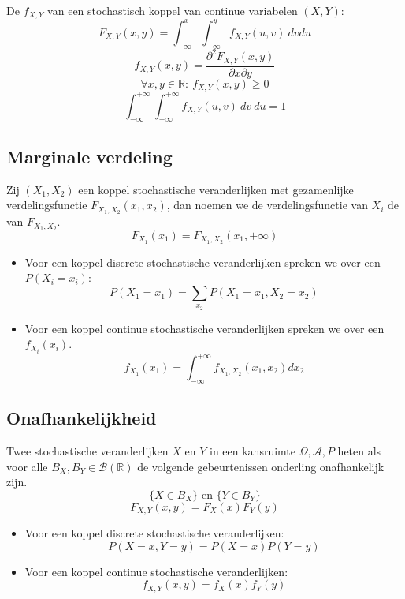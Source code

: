 \documentclass[main.tex]{subfiles}
\begin{document}
\begin{de}
  De  $f_{X,Y}$ van een stochastisch koppel van continue variabelen $(X,Y)$:
  \[ F_{X,Y}(x,y) = \int_{-\infty}^{x}\int_{-\infty}^{y}f_{X,Y}(u,v)\ dvdu \]
  \[ f_{X,Y}(x,y) = \frac{\partial^{2}F_{X,Y}(x,y)}{\partial x \partial y} \]
  \[ \forall x,y \in \mathbb{R}:\ f_{X,Y}(x,y) \ge 0 \]
  \[ \int_{-\infty}^{+\infty}\int_{-\infty}^{+\infty}f_{X,Y}(u,v)\ dv\ du = 1 \]
\end{de}


\subsection{Marginale verdeling}
\label{sec:marginale-verdeling}

\begin{de}
  Zij $(X_{1},X_{2})$ een koppel stochastische veranderlijken met gezamenlijke verdelingsfunctie $F_{X_{1},X_{2}}(x_{1},x_{2})$, dan noemen we de verdelingsfunctie van $X_{i}$ de  van $F_{X_{1},X_{2}}$.
  \[ F_{X_{1}}(x_{1}) = F_{X_{1},X_{2}}(x_{1},+\infty) \]
  \begin{itemize}
  \item Voor een koppel discrete stochastische veranderlijken spreken we over een  $P(X_{i} = x_{i})$:
    \[ P(X_{1}=x_{1}) = \sum_{x_{2}}P(X_{1}=x_{1},X_{2}=x_{2}) \]
  \item Voor een koppel continue stochastische veranderlijken spreken we over een  $f_{X_{i}}(x_{i})$.
    \[ f_{X_{1}}(x_{1}) = \int_{-\infty}^{+\infty}f_{X_{1},X_{2}}(x_{1},x_{2})dx_{2} \]
  \end{itemize}
\end{de}

\subsection{Onafhankelijkheid}
\label{sec:onafhankelijkheid}

\begin{de}
  Twee stochastische veranderlijken $X$ en $Y$ in een kansruimte $\Omega,\mathcal{A},P$ heten  als voor alle $B_{X},B_{Y} \in \mathcal{B}(\mathbb{R})$ de volgende gebeurtenissen onderling onafhankelijk zijn.
  \[ \{ X \in B_{X}\} \text{ en } \{ Y \in B_{Y} \} \]
  \[ F_{X,Y}(x,y) = F_{X}(x)F_{Y}(y) \]
  \begin{itemize}
  \item Voor een koppel discrete stochastische veranderlijken:
    \[ P(X=x,Y=y) = P(X=x)P(Y=y) \]
  \item Voor een koppel continue stochastische veranderlijken:
    \[ f_{X,Y}(x,y) = f_{X}(x)f_{Y}(y) \]
  \end{itemize}
\end{de}
\end{document}
